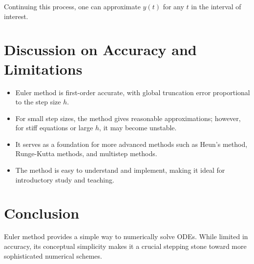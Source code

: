 \documentclass[11pt,a4paper]{article}
\begin{document}
Continuing this process, one can approximate \(y(t)\) for any \(t\) in the interval of interest.

\section{Discussion on Accuracy and Limitations}
\begin{itemize}
    \item Euler method is first-order accurate, with global truncation error proportional to the step size \(h\).  
    \item For small step sizes, the method gives reasonable approximations; however, for stiff equations or large \(h\), it may become unstable.  
    \item It serves as a foundation for more advanced methods such as Heun's method, Runge-Kutta methods, and multistep methods.  
    \item The method is easy to understand and implement, making it ideal for introductory study and teaching.
\end{itemize}

\section{Conclusion}
Euler method provides a simple way to numerically solve ODEs. While limited in accuracy, its conceptual simplicity makes it a crucial stepping stone toward more sophisticated numerical schemes.
\end{document}
